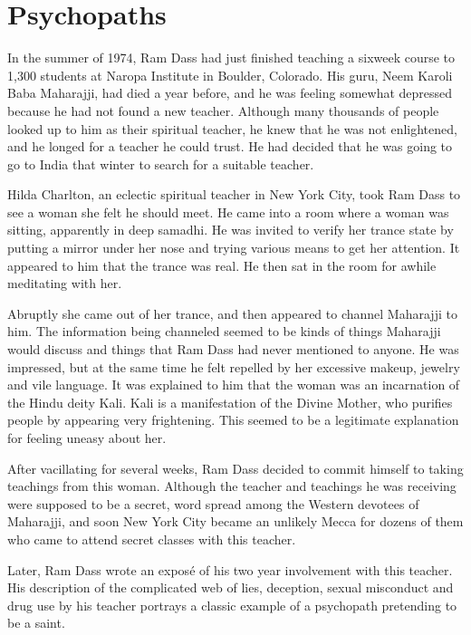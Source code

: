 \documentclass[a5paper,10pt,english]{book}
\begin{document}
\section{Psychopaths}
\label{\detokenize{psychopaths:psychopaths}}
\sphinxAtStartPar
In the summer of 1974, Ram Dass had just finished teaching a six\sphinxhyphen{}week
course to 1,300 students at Naropa Institute in Boulder, Colorado. His
guru, Neem Karoli Baba Maharajji, had died a year before, and he was
feeling somewhat depressed because he had not found a new teacher.
Although many thousands of people looked up to him as their spiritual
teacher, he knew that he was not enlightened, and he longed for a
teacher he could trust. He had decided that he was going to go to India
that winter to search for a suitable teacher.

\sphinxAtStartPar
Hilda Charlton, an eclectic spiritual teacher in New York City, took Ram
Dass to see a woman she felt he should meet. He came into a room where a
woman was sitting, apparently in deep samadhi. He was invited to verify
her trance state by putting a mirror under her nose and trying various
means to get her attention. It appeared to him that the trance was real.
He then sat in the room for awhile meditating with her.

\sphinxAtStartPar
Abruptly she came out of her trance, and then appeared to channel
Maharajji to him. The information being channeled seemed to be kinds of
things Maharajji would discuss and things that Ram Dass had never
mentioned to anyone. He was impressed, but at the same time he felt
repelled by her excessive makeup, jewelry and vile language. It was
explained to him that the woman was an incarnation of the Hindu deity
Kali. Kali is a manifestation of the Divine Mother, who purifies people
by appearing very frightening. This seemed to be a legitimate
explanation for feeling uneasy about her.

\sphinxAtStartPar
After vacillating for several weeks, Ram Dass decided to commit himself
to taking teachings from this woman. Although the teacher and teachings
he was receiving were supposed to be a secret, word spread among the
Western devotees of Maharajji, and soon New York City became an unlikely
Mecca for dozens of them who came to attend secret classes with this
teacher.

\sphinxAtStartPar
Later, Ram Dass wrote an exposé of his two year involvement with this
teacher. His description of the complicated web of lies, deception,
sexual misconduct and drug use by his teacher portrays a classic example
of a psychopath pretending to be a saint.
\end{document}
